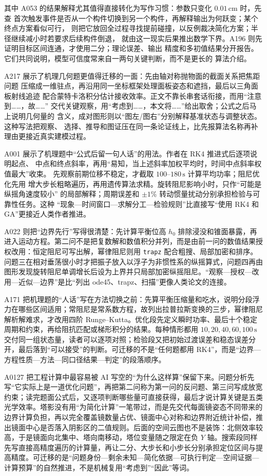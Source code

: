 \documentclass[UTF8,a4paper,12pt]{ctexart}
\begin{document}
其中 A053 的结果解释尤其值得直接转化为写作习惯：参数只变化 $0.01\,\mathrm{cm}$ 时，先查
首次触发事件是否从一个构件切换到另一个构件，再解释输出为何跃变；某个终点方案看似可行，
则把它放回全过程寻找提前碰撞，以反例裁决简化方案；半径继续减小时若要求后续构件倒退，
就由这一现实后果推出数学下界。A196 则先证明目标区间连通，才使用二分；理论误差、输出
精度和多初值结果分开报告。它们共同说明，模型可信度常来自一两句关键判断，而不是更长的
算法介绍。

A217 展示了机理几何题更值得迁移的一面：先由轴对称抛物面的截面关系把焦距问题
压缩成一维驻点，再沿用同一坐标框架处理面板姿态和遮挡，最后以三角面板射线追迹
配合蒙特卡洛积分估计接收效率。正文不靠长串套话衔接，而用“注意到……，故……”
交代关键观察，用“考虑到……，本文将……”给出取舍；公式之后马上说明几何量的
含义，成对图形则以“图左/图右”分别解释基准状态与调整状态。这种写法把观察、
选择、推导和图证压在同一条论证线上，比先报算法名称再补理由更接近真实建模过程。

A001 展示了机理题中“公式后留一句人话”的用法。作者在 RK4 推进式后逐项说明起点、
中点和终点斜率，再用“易知，当上述斜率加权平均时，时间中点斜率权值最大”收束。
先观察前期位移不稳定，才截取 $100$--$180\,\mathrm{s}$ 计算平均功率；阻尼优化先用
增大步长粗略遍历，再用遗传算法求精。旋转阻尼影响小时，只作“可能是纵摇角速度较小”
的局部解释；周期误差和 $\pm1\%$ 转动惯量扰动分别承担检验与可靠性任务。这种
“现象—时间窗口—求解分工—检验规则”比直接写“使用 RK4 和 GA”更接近人类作者推进。

A022 则把“边界先行”写得很清楚：先计算平衡位高 $h_0$ 排除浸没和锥面暴露，再进入运动方程。第二问不是把复数解和数值积分并列，而是由前一问的数值结果授权改用：恒定阻尼可写出解，幂律阻尼则用 \texttt{trapz} 配合粗搜、局部加密和排序。问题三在相对垂荡很小时才把振子放入以浮子为非惯性系的纵摇算式，问题四再由图形发现旋转阻尼单调增长后设为上界并只局部加密纵摇阻尼。“观察—授权—改用—近似—边界”是比“列出 ode45、trapz、扫描”更像人类论文的连接。

A171 把机理题的“人话”写在方法切换之前：先算平衡压缩量和吃水，说明分段浮力在哪些区间适用；常阻尼是常系数方程，故列出拉普拉斯变换的三步，幂律阻尼解析解难求，才改用四阶 Runge--Kutta。优化段先定义瞬时功率、最后十个稳定周期和约束，再给阻抗匹配或梯形积分的结果。每种情形都用 $10,20,40,60,100\,\mathrm{s}$ 交付同一组状态量，读者可以逐项对照；检验段又把初始过渡误差和稳态误差分开，最后落到“可以接受”的判断。可迁移的不是“任何题都用 RK4”，而是“边界—方程性质—方法—同口径结果—判定”的段落顺序。

A0127 把工程计算中最容易被 AI 写空的“为什么这样算”保留下来。问题分析先写“它实际上是一道优化问题”，再把第二问称为第一问的反问题、第三问写成放宽约束；读完题面公式后，又逐项判断哪些量可直接获得，最后才说计算关键是五类光学效率。塔影没有用“为简化计算”一笔带过，而是先交代每面镜姿态不同带来的边界计算负担，再以完全覆盖镜数量占优、镜面中心对称和边界附近统计补偿，推出镜面中心是否落入阴影区的二值规则。后面的空间云图也不是装饰：北侧效率较高，于是镜面向北集中、塔向南移动，塔位变量随之限定在负 $Y$ 轴。搜索段同样先写直接高精度遍历的计算量，再让二分、大步长和小步长分别承担定位区间与提高精度。可迁移的是“问题身份—剩余未知—简化依据—可执行判定—空间证据—计算预算”的自然推进，不是机械复用“考虑到”“因此”等词。
\end{document}
